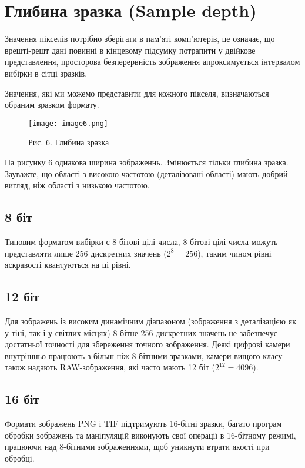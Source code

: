 \chapter{Глибина зразка (Sample depth)}\label{cha:sample_depth}
Значення пікселів потрібно зберігати в пам’яті комп’ютерів, це означає, що врешті-решт дані повинні в кінцевому підсумку потрапити у двійкове представлення, просторова безперервність зображення апроксимується інтервалом вибірки в сітці зразків.

Значення, які ми можемо представити для кожного пікселя, визначаються обраним зразком формату.

\begin{figure}
    \label{fig:image6}
    \centering
    \texttt{[image: image6.png]}

    Рис. 6. Глибина зразка
\end{figure}

На рисунку 6 однакова ширина зображеннь.
Змінюється тільки глибина зразка.
Зауважте, що області з високою частотою (деталізовані області) мають добрий вигляд, ніж області з низькою частотою.

\section{8 біт}\label{sec:bit_eight}
Типовим форматом вибірки є 8-бітові цілі числа, 8-бітові цілі числа можуть представляти лише 256 дискретних значень (\(2^{8} = 256\)), таким чином рівні яскравості квантуються на ці рівні.

\section{12 біт}\label{sec:bit_twelve}
Для зображень із високим динамічним діапазоном (зображення з деталізацією як у тіні, так і у світлих місцях) 8-бітне 256 дискретних значень не забезпечує достатньої точності для збереження точного зображення.
Деякі цифрові камери внутрішньо працюють з більш ніж 8-бітними зразками, камери вищого класу також надають RAW-зображення, які часто мають 12 біт (\(2^{12} = 4096\)).

\section{16 біт}\label{sec:bit_sixteen}
Формати зображень PNG і TIF підтримують 16-бітні зразки, багато програм обробки зображень та маніпуляцій виконують свої операції в 16-бітному режимі, працюючи над 8-бітними зображеннями, щоб уникнути втрати якості при обробці.

